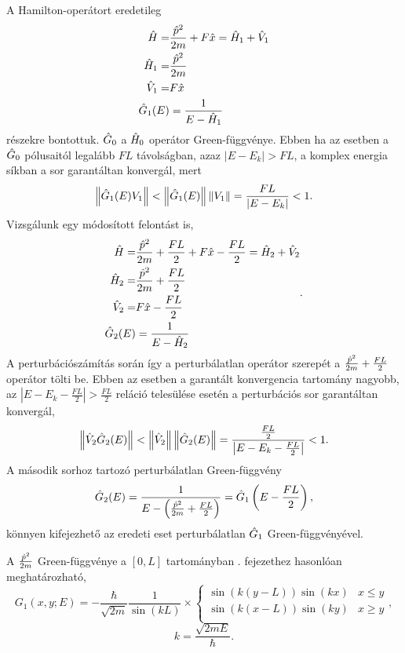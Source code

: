 A Hamilton-operátort eredetileg
\begin{equation}
	\begin{aligned}
		\hat{H}=&\frac{\hat{p}^2}{2m}+F\hat{x}=\hat{H}_1+\hat{V}_1\\
		\hat{H}_1=&\frac{\hat{p}^2}{2m}\\
		\hat{V}_1=&F\hat{x}\\
		\hat{G}_1(E)&=\frac{1}{E-\hat{H}_1}
	\end{aligned}
\end{equation}
részekre bontottuk. $\hat{G}_0$ a $\hat{H}_0$ operátor Green-függvénye. Ebben ha az esetben a $\hat{G}_0$ pólusaitól legalább $FL$ távolságban, azaz $\rvert E-E_k\lvert>FL$, a komplex energia síkban a sor garantáltan konvergál, mert
\begin{equation}
	\left\lVert \hat{G}_1(E)V_1 \right\rVert<\left\lVert \hat{G}_1(E) \right\rVert\left\lVert V_1 \right\rVert=\frac{FL}{\rvert E-E_k\lvert}<1.
\end{equation}
Vizsgálunk egy módosított felontást is,
\begin{equation}
	\begin{aligned}
		\hat{H}=&\frac{\hat{p}^2}{2m}+\frac{FL}{2}+F\hat{x}-\frac{FL}{2}=\hat{H}_2+\hat{V}_2\\
		\hat{H}_2=&\frac{\hat{p}^2}{2m}+\frac{FL}{2}\\
		\hat{V}_2=&F\hat{x}-\frac{FL}{2}\\
		\hat{G}_2(E)&=\frac{1}{E-\hat{H}_2}
	\end{aligned}.
\end{equation}
A perturbációszámítás során így a perturbálatlan operátor szerepét a $\frac{\hat{p}^2}{2m}+\frac{FL}{2}$ operátor tölti be.
Ebben az esetben a garantált konvergencia tartomány nagyobb, az $\left\lvert E-E_k-\frac{FL}{2}\right\rvert > \frac{FL}{2}$ reláció telesülése esetén a perturbációs sor garantáltan konvergál,
\begin{equation}
	\left\lVert \hat{V}_2\hat{G}_2(E) \right\rVert<\left\lVert \hat{V}_2 \right\rVert\left\lVert \hat{G}_2(E) \right\rVert=\frac{\frac{FL}{2}}{\left\lvert E-E_k-\frac{FL}{2}\right\rvert}<1.
	\label{perturbation:convradius}
\end{equation}
A második sorhoz tartozó perturbálatlan Green-függvény
\begin{equation}
	\hat{G}_2(E)=\frac{1}{E-\left(\frac{\hat{p}^2}{2m}+\frac{FL}{2}\right)}=\hat{G}_1\left(E-\frac{FL}{2}\right),
\end{equation}
könnyen kifejezhető az eredeti eset perturbálatlan $\hat{G}_1$ Green-függvényével.

A $\frac{\hat{p}^2}{2m}$ Green-függvénye a $[0,L]$ tartományban . fejezethez hasonlóan meghatározható,
\begin{equation}
	G_1\left(x,y;E\right) = -\frac{\hbar}{\sqrt{2m}}\frac{1}{\sin\left(kL\right)}\times
	\begin{cases}
		\sin\left(k\left(y-L\right)\right)\sin\left(kx\right) & x\leq y\\
		\sin\left(k\left(x-L\right)\right)\sin\left(ky\right) & x\geq y\\
	\end{cases},
\end{equation}
\begin{equation}
	k = \frac{\sqrt{2mE}}{\hbar}.
\end{equation}

